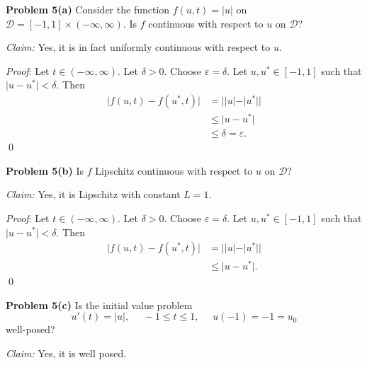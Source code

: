 \documentclass[12pt]{article}
\newcommand{\problem}[1]{\hspace{-4 ex} \large \textbf{Problem #1} }
\renewenvironment{proof}{\hspace{-4 ex} \emph{Proof}:}{\qed}
\begin{document}
\bigbreak
\problem{5(a)} Consider the function $f(u,t) = |u|$ on $\mathcal{D}=[-1,1] \times (-\infty, \infty)$. Is $f$ continuous with respect to $u$ on $\mathcal{D}$? \bigbreak

\textit{Claim:} Yes, it is in fact uniformly continuous with respect to $u$. \bigbreak

\begin{proof}
	Let $t \in (-\infty, \infty)$. Let $\delta >0$. Choose $\varepsilon = \delta$. Let $u, u^* \in [-1, 1]$ such that $\vert u - u^* \vert < \delta$. Then 
	\begin{align*}
		\vert f(u, t) - f(u^*,t) \vert &= \big \vert \vert u \vert - \vert u^* \vert \big \vert  \\
		& \leq \vert u - u^* \vert \tag{reverse triangle inequality} \\
		& \leq \delta = \varepsilon.
	\end{align*}
\end{proof}

\bigbreak
\problem{5(b)} Is $f$ Lipschitz continuous with respect to $u$ on $\mathcal{D}$? \bigbreak

\textit{Claim:} Yes, it is Lipschitz with constant $L = 1$. \bigbreak

\begin{proof}
	Let $t \in (-\infty, \infty)$. Let $\delta >0$. Choose $\varepsilon = \delta$. Let $u, u^* \in [-1, 1]$ such that $\vert u - u^* \vert < \delta$. Then 
	\begin{align*}
		\vert f(u, t) - f(u^*,t) \vert &= \big \vert \vert u \vert - \vert u^* \vert \big \vert  \\
		& \leq \vert u - u^* \vert. \tag{reverse triangle inequality}
	\end{align*}
\end{proof}

\bigbreak
\problem{5(c)} Is the initial value problem 
$$
u'(t) = \vert u \vert, \phantom{=} -1 \leq t \leq 1, \phantom{=}u(-1)=-1 = u_0
$$
well-posed? \bigbreak

\textit{Claim:} Yes, it is well posed. \bigbreak
\end{document}
